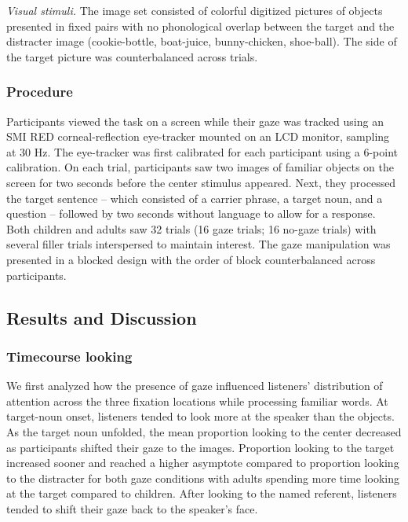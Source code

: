 \documentclass[10pt, letterpaper]{article}
\begin{document}
\emph{Visual stimuli.} The image set consisted of colorful digitized
pictures of objects presented in fixed pairs with no phonological
overlap between the target and the distracter image (cookie-bottle,
boat-juice, bunny-chicken, shoe-ball). The side of the target picture
was counterbalanced across trials.

\hypertarget{procedure}{%
\subsubsection{Procedure}\label{procedure}}

Participants viewed the task on a screen while their gaze was tracked
using an SMI RED corneal-reflection eye-tracker mounted on an LCD
monitor, sampling at 30 Hz. The eye-tracker was first calibrated for
each participant using a 6-point calibration. On each trial,
participants saw two images of familiar objects on the screen for two
seconds before the center stimulus appeared. Next, they processed the
target sentence -- which consisted of a carrier phrase, a target noun,
and a question -- followed by two seconds without language to allow for
a response. Both children and adults saw 32 trials (16 gaze trials; 16
no-gaze trials) with several filler trials interspersed to maintain
interest. The gaze manipulation was presented in a blocked design with
the order of block counterbalanced across participants.

\hypertarget{results-and-discussion}{%
\subsection{Results and Discussion}\label{results-and-discussion}}

\hypertarget{timecourse-looking}{%
\subsubsection{Timecourse looking}\label{timecourse-looking}}

We first analyzed how the presence of gaze influenced listeners'
distribution of attention across the three fixation locations while
processing familiar words. At target-noun onset, listeners tended to
look more at the speaker than the objects. As the target noun unfolded,
the mean proportion looking to the center decreased as participants
shifted their gaze to the images. Proportion looking to the target
increased sooner and reached a higher asymptote compared to proportion
looking to the distracter for both gaze conditions with adults spending
more time looking at the target compared to children. After looking to
the named referent, listeners tended to shift their gaze back to the
speaker's face.
\end{document}
